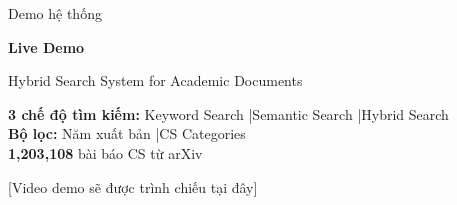 \begin{frame}{Demo hệ thống}
\begin{center}
\vspace{1cm}

{\LARGE\textbf{\textcolor{accentTeal}{Live Demo}}}

\vspace{0.5cm}

{\large Hybrid Search System for Academic Documents}

\vspace{0.5cm}

{\small
\textbf{3 chế độ tìm kiếm:} Keyword Search \quad|\quad Semantic Search \quad|\quad Hybrid Search\\[0.3cm]
\textbf{Bộ lọc:} Năm xuất bản \quad|\quad CS Categories\\[0.3cm]
\textbf{1,203,108} bài báo CS từ arXiv
}

\vspace{0.8cm}

{\footnotesize\textcolor{textMuted}{[Video demo sẽ được trình chiếu tại đây]}}
\end{center}
\end{frame}
